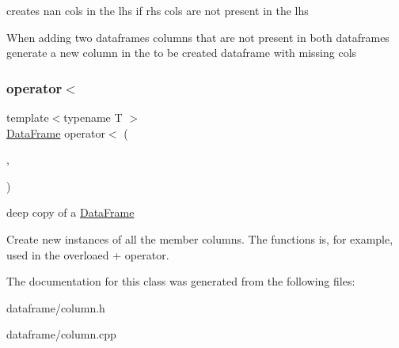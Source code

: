 creates nan cols in the lhs if rhs cols are not present in the lhs 

When adding two dataframes columns that are not present in both dataframes generate a new column in the to be created dataframe with missing cols \mbox{\label{classColumn_a92ccb0425c54a5b5cd6f78ed1bb4c3ff}} 
\subsubsection{\texorpdfstring{operator$<$}{operator<}}
{\footnotesize\ttfamily template$<$typename T $>$ \\
\hyperlink{classDataFrame}{Data\+Frame} operator$<$ (\begin{DoxyParamCaption}\item[{const \hyperlink{classDataFrame}{Data\+Frame} \&}]{,  }\item[{const T \&}]{ }\end{DoxyParamCaption})\hspace{0.3cm}{\ttfamily [friend]}}



deep copy of a \hyperlink{classDataFrame}{Data\+Frame} 

Create new instances of all the member columns. The functions is, for example, used in the overloaed + operator. 

The documentation for this class was generated from the following files\+:\begin{DoxyCompactItemize}
\item 
dataframe/column.\+h\item 
dataframe/column.\+cpp\end{DoxyCompactItemize}
